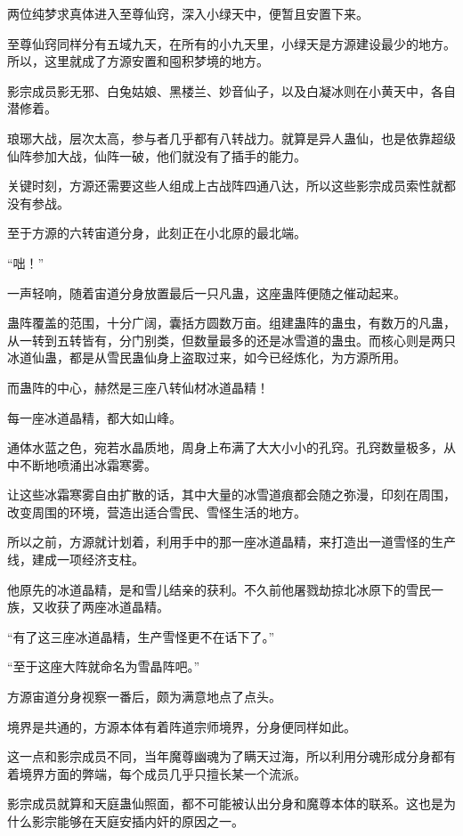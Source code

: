 
\begin{this_body}

两位纯梦求真体进入至尊仙窍，深入小绿天中，便暂且安置下来。

至尊仙窍同样分有五域九天，在所有的小九天里，小绿天是方源建设最少的地方。所以，这里就成了方源安置和囤积梦境的地方。

影宗成员影无邪、白兔姑娘、黑楼兰、妙音仙子，以及白凝冰则在小黄天中，各自潜修着。

琅琊大战，层次太高，参与者几乎都有八转战力。就算是异人蛊仙，也是依靠超级仙阵参加大战，仙阵一破，他们就没有了插手的能力。

关键时刻，方源还需要这些人组成上古战阵四通八达，所以这些影宗成员索性就都没有参战。

至于方源的六转宙道分身，此刻正在小北原的最北端。

“咄！”

一声轻响，随着宙道分身放置最后一只凡蛊，这座蛊阵便随之催动起来。

蛊阵覆盖的范围，十分广阔，囊括方圆数万亩。组建蛊阵的蛊虫，有数万的凡蛊，从一转到五转皆有，分门别类，但数量最多的还是冰雪道的蛊虫。而核心则是两只冰道仙蛊，都是从雪民蛊仙身上盗取过来，如今已经炼化，为方源所用。

而蛊阵的中心，赫然是三座八转仙材冰道晶精！

每一座冰道晶精，都大如山峰。

通体水蓝之色，宛若水晶质地，周身上布满了大大小小的孔窍。孔窍数量极多，从中不断地喷涌出冰霜寒雾。

让这些冰霜寒雾自由扩散的话，其中大量的冰雪道痕都会随之弥漫，印刻在周围，改变周围的环境，营造出适合雪民、雪怪生活的地方。

所以之前，方源就计划着，利用手中的那一座冰道晶精，来打造出一道雪怪的生产线，建成一项经济支柱。

他原先的冰道晶精，是和雪儿结亲的获利。不久前他屠戮劫掠北冰原下的雪民一族，又收获了两座冰道晶精。

“有了这三座冰道晶精，生产雪怪更不在话下了。”

“至于这座大阵就命名为雪晶阵吧。”

方源宙道分身视察一番后，颇为满意地点了点头。

境界是共通的，方源本体有着阵道宗师境界，分身便同样如此。

这一点和影宗成员不同，当年魔尊幽魂为了瞒天过海，所以利用分魂形成分身都有着境界方面的弊端，每个成员几乎只擅长某一个流派。

影宗成员就算和天庭蛊仙照面，都不可能被认出分身和魔尊本体的联系。这也是为什么影宗能够在天庭安插内奸的原因之一。


\end{this_body}
